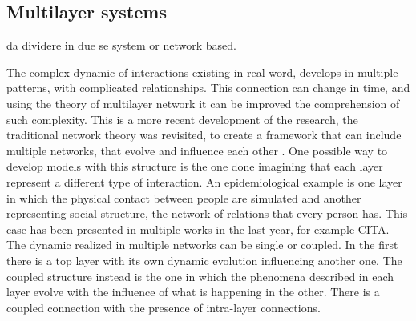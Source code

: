 \subsection{Multilayer systems} da dividere in due se system or network based. 

The complex dynamic of interactions existing in real word, develops in multiple patterns, with complicated relationships. This connection can change in time, and using the theory of multilayer network it can be improved the comprehension of such complexity. This is a more recent development of the research, the traditional network theory was revisited, to create a framework that can include multiple networks, that evolve and influence each other \cite{DeDomenico2016}. 
One possible way to develop models with this structure is the one done imagining that each layer represent a different type of interaction. An epidemiological example is one layer in which the physical contact between people are simulated and another representing social structure, the network of relations that every person has. This case has been presented in multiple works in the last year, for example CITA. 
The dynamic realized in multiple networks can be single or coupled. In the first there is a top layer with its own dynamic evolution influencing another one. The coupled structure instead is the one in which the phenomena described in each layer evolve with the influence of what is happening in the other. There is a coupled connection with the presence of intra-layer connections.





